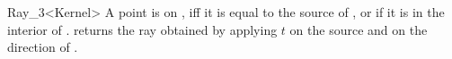 \begin{ccRefClass} {Ray_3<Kernel>}
       {A point is on \ccVar, iff it is equal to the source 
        of \ccVar, or if it is in the interior of \ccVar.}
% 
% 
       {returns the ray obtained by applying $t$ on the source 
        and on the direction of \ccVar.}

\ccSeeAlso
{}

\end{ccRefClass} 
